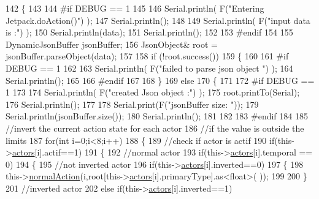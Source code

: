 \begin{DoxyCode}
142 \{
143 
144 \textcolor{preprocessor}{#if DEBUG == 1 }
145 
146     Serial.println( F(\textcolor{stringliteral}{"Entering Jetpack.doAction()"}) );
147     Serial.println();
148 
149     Serial.println( F(\textcolor{stringliteral}{"input data is :"}) );
150     Serial.println(data);
151     Serial.println();
152 
153 \textcolor{preprocessor}{#endif }
154 
155     DynamicJsonBuffer jsonBuffer;
156     JsonObject& root = jsonBuffer.parseObject(data);
157     
158     \textcolor{keywordflow}{if} (!root.success()) 
159     \{
160     
161 \textcolor{preprocessor}{    #if DEBUG == 1 }
162 
163         Serial.println( F(\textcolor{stringliteral}{"failed to parse json object "}) );
164         Serial.println();
165     
166 \textcolor{preprocessor}{    #endif }
167 
168     \}
169     \textcolor{keywordflow}{else}
170     \{
171     
172 \textcolor{preprocessor}{    #if DEBUG == 1 }
173 
174         Serial.println( F(\textcolor{stringliteral}{"created Json object :"}) );
175         root.printTo(Serial);
176         Serial.println();
177 
178         Serial.print(F(\textcolor{stringliteral}{"jsonBuffer size: "}));
179         Serial.println(jsonBuffer.size());
180         Serial.println();
181 
182     
183 \textcolor{preprocessor}{    #endif }
184 
185         \textcolor{comment}{//invert the current action state for each actor}
186         \textcolor{comment}{//if the value is outside the limits}
187         \textcolor{keywordflow}{for}(\textcolor{keywordtype}{int} i=0;i<8;i++)
188         \{
189             \textcolor{comment}{//check if actor is actif}
190             \textcolor{keywordflow}{if}(this->\hyperlink{class_jetpack_a7e16d2f97837f9712a2e6de1c50d99db}{actors}[i].actif==1)
191             \{
192                 \textcolor{comment}{//normal actor}
193                 \textcolor{keywordflow}{if}(this->\hyperlink{class_jetpack_a7e16d2f97837f9712a2e6de1c50d99db}{actors}[i].temporal == 0)
194                 \{
195                     \textcolor{comment}{//not inverted actor}
196                     \textcolor{keywordflow}{if}(this->\hyperlink{class_jetpack_a7e16d2f97837f9712a2e6de1c50d99db}{actors}[i].inverted==0)
197                     \{
198                         this->\hyperlink{class_jetpack_a65ce9533c39fa71e4945b970bf14b980}{normalAction}(i,root[this->\hyperlink{class_jetpack_a7e16d2f97837f9712a2e6de1c50d99db}{actors}[i].primaryType].as<float>(
      ));
199             
200                     \}
201                     \textcolor{comment}{//inverted actor}
202                     \textcolor{keywordflow}{else} \textcolor{keywordflow}{if}(this->\hyperlink{class_jetpack_a7e16d2f97837f9712a2e6de1c50d99db}{actors}[i].inverted==1)

\end{DoxyCode}
